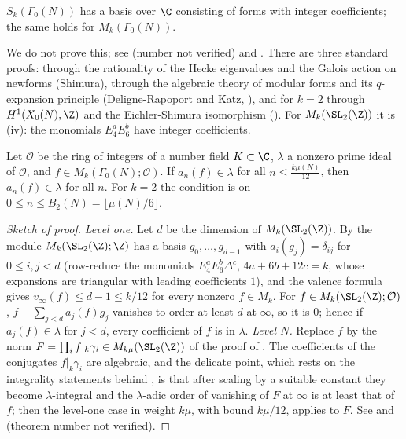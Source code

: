 \begin{theorem}\label{thm:modforms:integral-basis}
$S_k(\Gamma_0(N))$ has a basis over $\C$ consisting of forms with integer coefficients; the same holds for $M_k(\Gamma_0(N))$.
\end{theorem}

We do not prove this; see \cite[Theorem 3.52]{Shimura71} (number not verified) and \cite[Section 6.5]{DiamondShurman}. There are three standard proofs: through the
rationality of the Hecke eigenvalues and the Galois action on newforms (Shimura), through the algebraic theory of modular forms and its $q$-expansion principle
(Deligne-Rapoport and Katz, \cite{DeligneRapoport73}), and for $k=2$ through $H^1(X_0(N),\Z)$ and the Eichler-Shimura isomorphism (). For $M_k(\SL_2(\Z))$ it is
(iv): the monomials $E_4^aE_6^b$ have integer coefficients.

\begin{theorem}\label{thm:modforms:sturm}
Let $\mathcal O$ be the ring of integers of a number field $K\subset\C$, $\lambda$ a nonzero prime ideal of $\mathcal O$, and $f\in M_k(\Gamma_0(N);\mathcal O)$. If $a_n(f)\in\lambda$ for all
$n\le\frac{k\mu(N)}{12}$, then $a_n(f)\in\lambda$ for all $n$. For $k=2$ the condition is on $0\le n\le B_2(N)=\lfloor\mu(N)/6\rfloor$.
\end{theorem}

\begin{proof}[Sketch of proof]
\emph{Level one.} Let $d$ be the dimension of $M_k(\SL_2(\Z))$. By  the module $M_k(\SL_2(\Z);\Z)$ has a basis $g_0,\dots,g_{d-1}$ with $a_i(g_j)=\delta_{ij}$ for
$0\le i,j<d$ (row-reduce the monomials $E_4^aE_6^b\Delta^c$, $4a+6b+12c=k$, whose expansions are triangular with leading coefficients $1$), and the valence formula gives
$v_\infty(f)\le d-1\le k/12$ for every nonzero $f\in M_k$. For $f\in M_k(\SL_2(\Z);\mathcal O)$, $f-\sum_{j<d}a_j(f)g_j$ vanishes to order at least $d$ at $\infty$, so it is $0$; hence if
$a_j(f)\in\lambda$ for $j<d$, every coefficient of $f$ is in $\lambda$. \emph{Level $N$.} Replace $f$ by the norm $F=\prod_if|_k\gamma_i\in M_{k\mu}(\SL_2(\Z))$ of the proof of
. The coefficients of the conjugates $f|_k\gamma_i$ are algebraic, and the delicate point, which rests on the integrality statements behind
, is that after scaling by a suitable constant they become $\lambda$-integral and the $\lambda$-adic order of vanishing of $F$ at $\infty$ is at least
that of $f$; then the level-one case in weight $k\mu$, with bound $k\mu/12$, applies to $F$. See \cite{Sturm87} and \cite[Chapter 9]{Stein} (theorem number not verified).
\end{proof}

